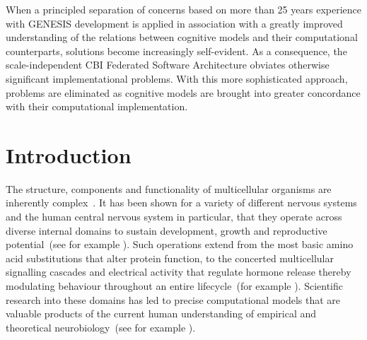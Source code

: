 \documentclass[10pt,letterpaper]{article}
\begin{document}
When a principled separation of concerns based on more than 25 years experience with GENESIS development is applied in association with a greatly improved understanding of the relations between cognitive models and their computational counterparts, solutions become increasingly self-evident. As a consequence, the scale-independent CBI Federated Software Architecture obviates otherwise significant implementational problems. With this more sophisticated approach, problems are eliminated as cognitive models are brought into greater concordance with their computational implementation.


\linenumbers

\section*{Introduction}

The structure, components and functionality of multicellular organisms are inherently complex~\cite{walpole13}. It has been shown for a variety of different nervous systems and the human central nervous system in particular, that they operate across diverse internal domains to sustain development, growth and reproductive potential~(see for example \cite{selverston87,vonk22,kandel21}). Such operations extend from the most basic amino acid substitutions that alter protein function, to the concerted multicellular signalling cascades and electrical activity that regulate hormone release thereby modulating behaviour throughout an entire lifecycle~(for example \cite{ejn17}). Scientific research into these domains has led to precise computational models that are valuable products of the current human understanding of empirical and theoretical neurobiology~(see for example \cite{bower13,nandi22}). 
\end{document}
